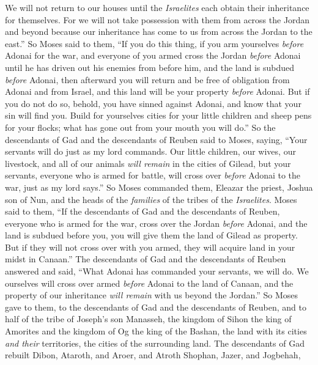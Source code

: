 \begin{biblechapter}
\verse We will not return to our houses until the \textit{Israelites} each obtain their inheritance for themselves.
\verse For we will not take possession with them from across the Jordan and beyond because our inheritance has come to us from across the Jordan to the east.”
\verse So Moses said to them, “If you do this thing, if you arm yourselves \textit{before} Adonai for the war,
\verse and everyone of you armed cross the Jordan \textit{before} Adonai until he has driven out his enemies from before him,
\verse and the land is subdued \textit{before} Adonai, then afterward you will return and be free of obligation from Adonai and from Israel, and this land will be your property \textit{before} Adonai.
\verse But if you do not do so, behold, you have sinned against Adonai, and know that your sin will find you.
\verse Build for yourselves cities for your little children and sheep pens for your flocks; what has gone out from your mouth you will do.”
\verse So the descendants of Gad and the descendants of Reuben said to Moses, saying, “Your servants will do just as my lord commands.
\verse Our little children, our wives, our livestock, and all of our animals \textit{will remain} in the cities of Gilead,
\verse but your servants, everyone who is armed for battle, will cross over \textit{before} Adonai to the war, just as my lord says.”
\verse So Moses commanded them, Eleazar the priest, Joshua son of Nun, and the heads of the \textit{families} of the tribes of the \textit{Israelites}.
\verse Moses said to them, “If the descendants of Gad and the descendants of Reuben, everyone who is armed for the war, cross over the Jordan \textit{before} Adonai, and the land is subdued before you, you will give them the land of Gilead as property.
\verse But if they will not cross over with you armed, they will acquire land in your midst in Canaan.”
\verse The descendants of Gad and the descendants of Reuben answered and said, “What Adonai has commanded your servants, we will do.
\verse We ourselves will cross over armed \textit{before} Adonai to the land of Canaan, and the property of our inheritance \textit{will remain} with us beyond the Jordan.”
\verse So Moses gave to them, to the descendants of Gad and the descendants of Reuben, and to half of the tribe of Joseph’s son Manasseh, the kingdom of Sihon the king of Amorites and the kingdom of Og the king of the Bashan, the land with its cities \textit{and their} territories, the cities of the surrounding land.
\verse The descendants of Gad rebuilt Dibon, Ataroth, and Aroer,
\verse and Atroth Shophan, Jazer, and Jogbehah,

\end{biblechapter}
